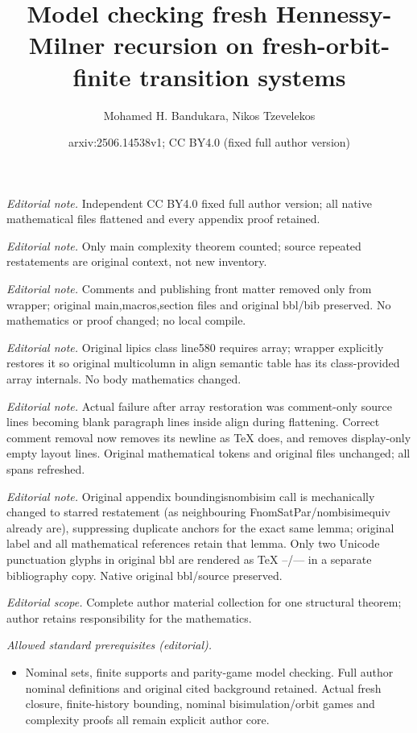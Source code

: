 \documentclass[10pt,a4paper]{article}
\title{Model checking fresh Hennessy-Milner recursion on fresh-orbit-finite transition systems}
\author{Mohamed H. Bandukara, Nikos Tzevelekos}
\date{arxiv:2506.14538v1; CC BY4.0 (fixed full author version)}
\theoremstyle{definition}
\theoremstyle{remark}
\begin{document}
\maketitle
\noindent\textit{Editorial note.} Independent CC BY4.0 fixed full author version; all native mathematical files flattened and every appendix proof retained.\par\medskip
\noindent\textit{Editorial note.} Only main complexity theorem counted; source repeated restatements are original context, not new inventory.\par\medskip
\noindent\textit{Editorial note.} Comments and publishing front matter removed only from wrapper; original main,macros,section files and original bbl/bib preserved. No mathematics or proof changed; no local compile.\par\medskip
\noindent\textit{Editorial note.} Original lipics class line580 requires array; wrapper explicitly restores it so original multicolumn in align semantic table has its class-provided array internals. No body mathematics changed.\par\medskip
\noindent\textit{Editorial note.} Actual failure after array restoration was comment-only source lines becoming blank paragraph lines inside align during flattening. Correct comment removal now removes its newline as TeX does, and removes display-only empty layout lines. Original mathematical tokens and original files unchanged; all spans refreshed.\par\medskip
\noindent\textit{Editorial note.} Original appendix boundingisnombisim call is mechanically changed to starred restatement (as neighbouring FnomSatPar/nombisimequiv already are), suppressing duplicate anchors for the exact same lemma; original label and all mathematical references retain that lemma. Only two Unicode punctuation glyphs in original bbl are rendered as TeX --/--- in a separate bibliography copy. Native original bbl/source preserved.\par\medskip
\noindent\textit{Editorial scope.} Complete author material collection for one structural theorem; author retains responsibility for the mathematics.\par\medskip
\noindent\textit{Allowed standard prerequisites (editorial).}\begin{itemize}
\item Nominal sets, finite supports and parity-game model checking. Full author nominal definitions and original cited background retained. Actual fresh closure, finite-history bounding, nominal bisimulation/orbit games and complexity proofs all remain explicit author core.
\end{itemize}\medskip
\end{document}

